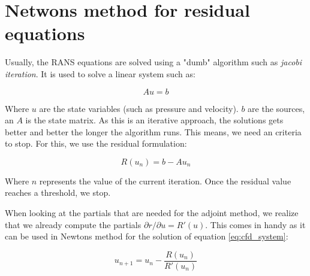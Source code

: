 


\section{Netwons method for residual equations}
Usually, the RANS equations are solved using a "dumb" algorithm such as
\textit{jacobi iteration}. It is used to solve a linear system such as:

\begin{equation}
    \label{eq:cfd_system}
    Au = b
\end{equation}

\noindent Where $u$ are the state variables (such as pressure and velocity). $b$
are the sources, an $A$ is the state matrix. As this is an iterative approach,
the solutions gets better and better the longer the algorithm runs. This means,
we need an criteria to stop. For this, we use the residual formulation:

\begin{equation}
    R(u_n) = b - Au_n 
\end{equation}
 
\noindent Where $n$ represents the value of the current iteration. Once the
residual value reaches a threshold, we stop.

When looking at the partials that are needed for the adjoint method, we realize
that we already compute the partials $\partial r / \partial u = R'(u)$. This
comes in handy as it can be used in Newtons method for the solution of equation
\ref{eq:cfd_system}:

\begin{equation}
    u_{n+1} = u_n - \frac{R(u_n)}{R'(u_n)}
\end{equation}

